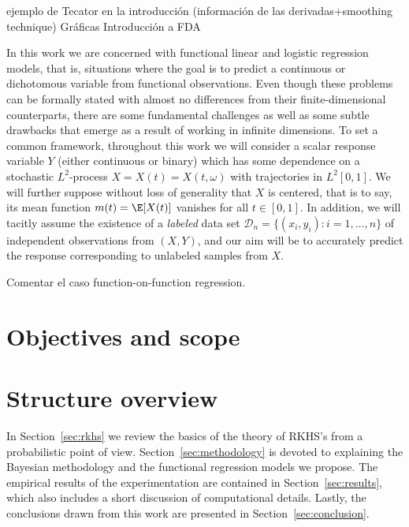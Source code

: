 \begin{outcomment}
  ejemplo de Tecator en la introducción (información de las derivadas+smoothing technique)
  Gráficas
  Introducción a FDA
\end{outcomment}

\begin{center}
\color{teal}\FourStar
\end{center}

In this work we are concerned with functional linear and logistic regression models, that is, situations where the goal is to predict a continuous or dichotomous variable from functional observations. Even though these problems can be formally stated with almost no differences from their finite-dimensional counterparts, there are some fundamental challenges as well as some subtle drawbacks that emerge as a result of working in infinite dimensions. To set a common framework, throughout this work we will consider a scalar response variable \(Y\) (either continuous or binary) which has some dependence on a stochastic \(L^2\)-process \(X=X(t)=X(t, \omega)\) with trajectories in \(L^2[0, 1]\).  We will further suppose without loss of generality that \(X\) is centered, that is to say, its mean function \(m(t)=\E[X(t)]\) vanishes for all \(t\in[0,1]\). In addition, we will tacitly assume the existence of a \textit{labeled} data set \(\mathcal D_n =\{(x_i, y_i): i=1,\dots, n\}\) of independent observations from \((X, Y)\), and our aim will be to accurately predict the response corresponding to unlabeled samples from \(X\).

\begin{outcomment}
  Comentar el caso function-on-function regression.
\end{outcomment}

\section{Objectives and scope}

\section{Structure overview}

In Section~\ref{sec:rkhs} we review the basics of the theory of RKHS's from a probabilistic point of view. Section~\ref{sec:methodology} is devoted to explaining the Bayesian methodology and the functional regression models we propose. The empirical results of the experimentation are contained in Section~\ref{sec:results}, which also includes a short discussion of computational details. Lastly, the conclusions drawn from this work are presented in Section~\ref{sec:conclusion}.
